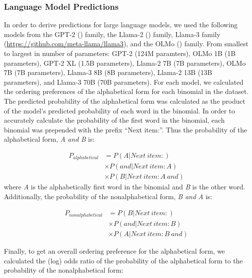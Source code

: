 \documentclass[
  12pt,
  letterpaper,
]{scrreprt}
\begin{document}
\subsubsection{Language Model
Predictions}\label{language-model-predictions}

In order to derive predictions for large language models, we used the
following models from the GPT-2
()
family, the Llama-2 () family, Llama-3 family
(\hyperref[0]{https://github.com/meta-llama/llama3}), and the OLMo
() family. From smallest to largest in number of parameters: GPT-2
(124M paramters), OLMo 1B (1B parameters), GPT-2 XL (1.5B parameters),
Llama-2 7B (7B parameters), OLMo 7B (7B parameters), Llama-3 8B (8B
parameters), Llama-2 13B (13B parameters), and Llama-3 70B (70B
parameters). For each model, we calculated the ordering preferences of
the alphabetical form for each binomial in the dataset. The predicted
probability of the alphabetical form was calculated as the product of
the model's predicted probability of each word in the binomial. In order
to accurately calculate the probability of the first word in the
binomial, each binomial was prepended with the prefix ``Next item:''.
Thus the probability of the alphabetical form, \emph{A and B} is:

\[
\begin{aligned}
    P_{alphabetical} & = P(A|Next\:item: )\\
      & \times P(and|Next\:item: A)\\
      & \times P(B|Next\:item: A\: and)
\end{aligned}
\] \noindent where \emph{A} is the alphabetically first word in the
binomial and \emph{B} is the other word. Additionally, the probability
of the nonalphabetical form, \emph{B and A} is:

\[
\begin{aligned}
    P_{nonalphabetical} & = P(B|Next\:item: )\\
      & \times P(and|Next\:item: B)\\
      & \times P(A|Next\:item: B\: and)
\end{aligned}
\]

Finally, to get an overall ordering preference for the alphabetical
form, we calculated the (log) odds ratio of the probability of the
alphabetical form to the probability of the nonalphabetical form:
\end{document}
